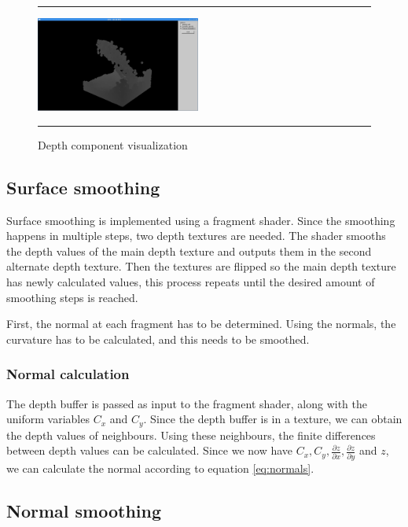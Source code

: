 \begin{figure}[!th]
\hrule
\begin{center}
\vspace*{2ex}\includegraphics[width=0.48\textwidth]{pictures/depth.png}
\end{center}
\caption{Depth component visualization}
\label{fig:depth} 
\vspace*{2ex}
\hrule
\end{figure}

\subsection{Surface smoothing}
Surface smoothing is implemented using a fragment shader.
Since the smoothing happens in multiple steps, two depth textures are needed.
The shader smooths the depth values of the main depth texture and outputs them in the second alternate depth texture.
Then the textures are flipped so the main depth texture has newly calculated values, this process repeats until the desired amount of smoothing steps is reached.

First, the normal at each fragment has to be determined.
Using the normals, the curvature has to be calculated, and this needs to be smoothed.

\subsubsection{Normal calculation}
The depth buffer is passed as input to the fragment shader, along with the uniform variables $C_x$ and $C_y$.
Since the depth buffer is in a texture, we can obtain the depth values of neighbours.
Using these neighbours, the finite differences between depth values can be calculated.
Since we now have $C_x, C_y, \frac{\partial z}{\partial x}, \frac{\partial z}{\partial y}$ and $z$, we can calculate the normal according to equation \ref{eq:normals}.

\subsection{Normal smoothing}


